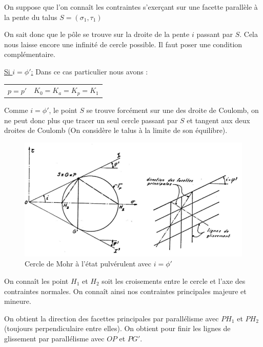            On suppose que l'on connaît les contraintes s'exerçant sur une facette parallèle à la pente du talus $S = (\sigma_1, \tau_1)$ 
            
            On sait donc que le pôle se trouve sur la droite de la pente $i$ passant par $S$. Cela nous laisse encore une infinité de cercle possible. Il faut poser une condition complémentaire. 
            
            \underline{Si $i = \phi'$:} 
            Dans ce cas particulier nous avons : 
            
            \begin{center}
            \begin{tabular}{cc}
                $p = p'$ \: \: & $K_0 = K_a = K_p = K_1$ 
            \end{tabular}
            \end{center}
            
            Comme $i=\phi'$, le point $S$ se trouve forcément sur une des droite de Coulomb, on ne peut donc plus que tracer un seul cercle passant par $S$ et tangent aux deux droites de Coulomb (On considère le talus à la limite de son équilibre).

            \begin{figure}[h!]
            \center
            \includegraphics[scale=0.7]{Holeyman/images/H7.PNG}
            \caption{Cercle de Mohr à l’état pulvérulent avec $i=\phi'$ }
            \end{figure}
            
            On connaît les point $H_1$ et $H_2$ soit les croisements entre le cercle et l'axe des contraintes normales. On connaît ainsi nos contraintes principales majeure et mineure. 
            
            On obtient la direction des facettes principales par parallélisme avec $PH_1$ et $PH_2$ (toujours perpendiculaire entre elles). On obtient pour finir les lignes de glissement par parallélisme avec $OP$ et $PG'$. 
            
